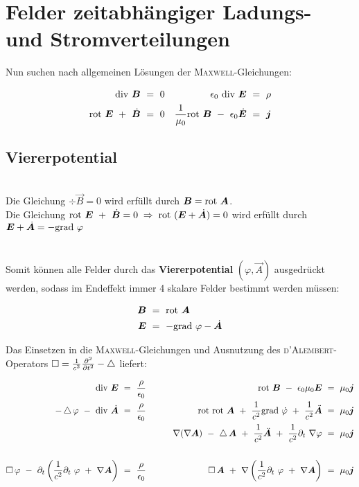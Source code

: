 \chapter[Zeitabhängige Quellenverteilungen]{Felder zeitabhängiger Ladungs- und Stromverteilungen}

Nun suchen nach allgemeinen Lösungen der \textsc{Maxwell}-Gleichungen:

\begin{align*}
\div \vec{B}  \ &= \ 0 & \epsilon_0 \ \div\vec{E}  \ &= \ \rho\\
\rot\vec{E} \ + \ \dot{\vec{B}} \ &= \ 0 & \frac{1}{\mu_0}\rot\vec{B}\ - \ \epsilon_0\dot{\vec{E}}  \ &= \ \vec{j}
\end{align*}

\section{Viererpotential}

\ \\
Die Gleichung $\div \vec{B} = 0 $ wird erfüllt durch $\bm{B}=\text{rot }\bm{A}$.\\
Die Gleichung $\text{rot }\bm{E} \ + \ \dot{\bm{B}} = 0 \; \Rightarrow \; \text{rot } (\bm{E} + \dot{\bm{A}}) =0$ wird erfüllt durch $\bm{E} + \dot{\bm{A}}= - \text{grad }\varphi$\\
\ \\
\ \\
Somit können alle Felder durch das \textbf{Viererpotential} $(\varphi,\vec{A})$ ausgedrückt werden, sodass im Endeffekt immer 4 skalare Felder bestimmt werden müssen:

\begin{align*}
\bm{B} \ &= \ \text{rot } \bm{A}\\
\bm{E} \ &= \ - \text{grad } \varphi - \dot{\bm{A}}
\end{align*}

\newpage
Das Einsetzen in die \textsc{Maxwell}-Gleichungen und Ausnutzung des \textsc{d'Alembert}-Operators  $\mathop{{}\Box}\nolimits  =  \frac{1}{c^2}\frac{\partial ^2{}}{\partial{t}^2} - \mathop{{}\bigtriangleup}\nolimits$ liefert:

\begin{align*}
\div\vec{E}  \ &= \  \frac{\rho}{\epsilon_0} \qquad  & \rot \vec{B} \ - \ \epsilon_0\mu_0\vec{E}  \ = \ \mu_0\vec{j}\\
-\laplace\varphi \ - \ \div\dot{\vec{A}}  \ &= \ \frac{\rho}{\epsilon_0}	\qquad	& \rot\rot\vec{A} \ + \ \frac{1}{c^2}\grad\dot{\varphi} \ + \ \frac{1}{c^2} \ddot{\vec{A}}  \ = \ \mu_0\vec{j}\\
&& \nabla(\nabla\vec{A}) \ - \ \laplace\vec{A} \ + \ \frac{1}{c^2}\ddot{\vec{A}} \ + \ \frac{1}{c^2}\partial_t \ \nabla\varphi  \ = \ \mu_0\vec{j}\\
\ \\
\Dalembert\varphi  \ - \ \partial_t\left(\frac{1}{c^2}\partial_t\ \varphi \ + \ \nabla\vec{A}\right)  \ &= \ \frac{\rho}{\epsilon_0}  \qquad &
\Dalembert\vec{A} \ + \ \nabla\left(\frac{1}{c^2} \partial_t \ \varphi \ + \ \nabla\vec{A}\right) \ = \ \mu_0\vec{j}
\end{align*}

